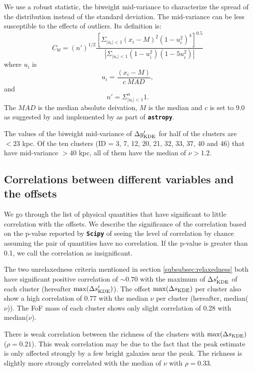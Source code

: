 We use a robust statistic, the biweight mid-variance to characterize the spread
of the distribution instead of the standard deviation. The mid-variance can be
less susceptible to the effects of outliers.
Its definition is:
\begin{equation}
      C_{bl}= (n')^{1/2} \frac{[\Sigma_{|u_i|<1} (x_i-M)^2(1-u_i^2)^4]^{0.5}}
      {|\Sigma_{|u_i|<1} (1-u_i^2)(1-5u_i^2)|}
\end{equation}
where $u_i$ is 
\begin{equation}
		u_{i} = \frac{(x_i-M)}{c~MAD},
\end{equation}
and 
\begin{equation}
   n' = \Sigma_{|u_i|<1}^n 1.
 \end{equation}
The $MAD$ is the median absolute deivation, $M$ is the median 
and $c$ is set to 9.0 as suggested by \cite{Beers90} and implemented by
\cite{astropy} as part of {\bf \texttt{astropy}}.

The values of the biweight mid-variance of $\Delta y_{\rm KDE}'$ for half of the clusters
are $< 23$ kpc. Of the ten clusters (ID = 3, 7, 12, 20, 21, 32, 33, 37, 40 and 46) 
that have mid-variance $ > 40$ kpc, all of them have the median of $\nu > 1.2$.
 
\subsection{Correlations between different variables and the offsets}

We go through the list of physical quantities that have significant to little
correlation with the offsets. We describe the significance of the correlation 
based on the p-value reported by {\bf \texttt{Scipy}} of seeing the level of 
correlation by chance assuming the pair of 
quantities have no correlation. If the p-value is greater than 0.1, we call the
correlation as insignificant.

The two unrelaxedness criteria mentioned in section \ref{subsubsec:relaxedness}
both have significant positive correlation of $\sim 0.70$
with the maximum of $\Delta s_{\rm KDE}'$ of each cluster
(hereafter $\max(\Delta s_{\rm KDE}')$).
The offset $\max(\Delta s_{\rm KDE})$ per cluster also show a high
correlation of 0.77 with the median $\nu$ per cluster (hereafter,
median($\nu$)). The FoF mass of each cluster shows only slight correlation of 0.28 with 
 median($\nu$).

There is weak correlation between the richness of the
clusters with $\max(\Delta s_{\rm KDE})$ ($\rho = 0.21$). This weak correlation 
may be due to 
the fact that the peak estimate is only affected strongly by a few bright galaxies near 
the peak. The richness is slightly more strongly correlated with the median of $\nu$ 
with $\rho = 0.33$. 

